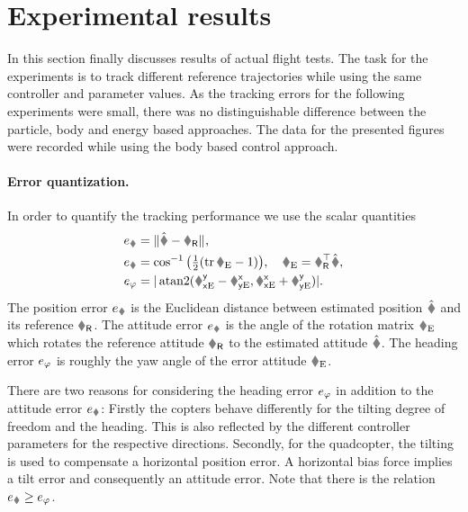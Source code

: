 \section{Experimental results}
In this section finally discusses results of actual flight tests.
The task for the experiments is to track different reference trajectories while using the same controller and parameter values.
As the tracking errors for the following experiments were small, there was no distinguishable difference between the particle, body and energy based approaches.
The data for the presented figures were recorded while using the body based control approach.

\paragraph{Error quantization.}
In order to quantify the tracking performance we use the scalar quantities 
\begin{subequations}
\begin{align}
 e_{\r} &= \norm{\rObs - \rR},
\\
 e_{\R} &= \cos^{-1} \big( \tfrac{1}{2} (\tr\RE - 1) \big), \quad \RE = \RRT \RObs,
\\
 e_{\head} &= |\atanTwo(\REyx - \RExy, \RExx + \REyy)|.
\end{align} 
\end{subequations}
The position error $e_{\r}$ is the Euclidean distance between estimated position $\rObs$ and its reference $\rR$.
The attitude error $e_{\R}$ is the angle of the rotation matrix $\RE$ which rotates the reference attitude $\RR$ to the estimated attitude $\RObs$.
The heading error $e_{\varphi}$ is roughly the yaw angle of the error attitude $\RE$.

There are two reasons for considering the heading error $e_{\varphi}$ in addition to the attitude error $e_{\R}$:
Firstly the copters behave differently for the tilting degree of freedom and the heading.
This is also reflected by the different controller parameters for the respective directions.
Secondly, for the quadcopter, the tilting is used to compensate a horizontal position error.
A horizontal bias force implies a tilt error and consequently an attitude error.
Note that there is the relation $e_{\R} \geq e_{\head}$.

